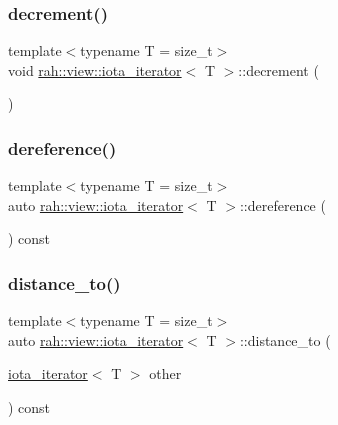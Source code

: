 \mbox{\label{structrah_1_1view_1_1iota__iterator_ab11421ab7ec8d986bdf7ef5f930d0b43}} 
\subsubsection{\texorpdfstring{decrement()}{decrement()}}
{\footnotesize\ttfamily template$<$typename T  = size\+\_\+t$>$ \\
void \mbox{\hyperlink{structrah_1_1view_1_1iota__iterator}{rah\+::view\+::iota\+\_\+iterator}}$<$ T $>$\+::decrement (\begin{DoxyParamCaption}{ }\end{DoxyParamCaption})\hspace{0.3cm}{\ttfamily [inline]}}

\mbox{\label{structrah_1_1view_1_1iota__iterator_ae31c733c52f77c7c199802db6638541d}} 
\subsubsection{\texorpdfstring{dereference()}{dereference()}}
{\footnotesize\ttfamily template$<$typename T  = size\+\_\+t$>$ \\
auto \mbox{\hyperlink{structrah_1_1view_1_1iota__iterator}{rah\+::view\+::iota\+\_\+iterator}}$<$ T $>$\+::dereference (\begin{DoxyParamCaption}{ }\end{DoxyParamCaption}) const\hspace{0.3cm}{\ttfamily [inline]}}

\mbox{\label{structrah_1_1view_1_1iota__iterator_a3662abe8721e4c5c7bbc4214e36c4920}} 
\subsubsection{\texorpdfstring{distance\_to()}{distance\_to()}}
{\footnotesize\ttfamily template$<$typename T  = size\+\_\+t$>$ \\
auto \mbox{\hyperlink{structrah_1_1view_1_1iota__iterator}{rah\+::view\+::iota\+\_\+iterator}}$<$ T $>$\+::distance\+\_\+to (\begin{DoxyParamCaption}\item[{\mbox{\hyperlink{structrah_1_1view_1_1iota__iterator}{iota\+\_\+iterator}}$<$ T $>$}]{other }\end{DoxyParamCaption}) const\hspace{0.3cm}{\ttfamily [inline]}}

